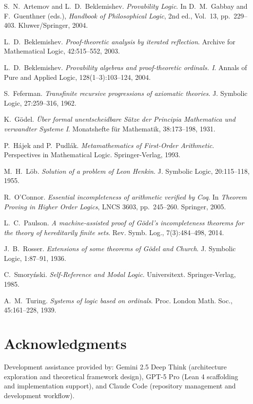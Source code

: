 \documentclass[11pt]{article}
\begin{document}
\begin{thebibliography}{10}

S.~N.~Artemov and L.~D.~Beklemishev.
\emph{Provability Logic}.
In D.~M.~Gabbay and F.~Guenthner (eds.), \emph{Handbook of Philosophical Logic}, 2nd ed., Vol.~13, pp.~229--403.
Kluwer/Springer, 2004.

L.~D.~Beklemishev.
\emph{Proof-theoretic analysis by iterated reflection}.
Archive for Mathematical Logic, 42:515--552, 2003.

L.~D.~Beklemishev.
\emph{Provability algebras and proof-theoretic ordinals. I}.
Annals of Pure and Applied Logic, 128(1--3):103--124, 2004.

S.~Feferman.
\emph{Transfinite recursive progressions of axiomatic theories}.
J. Symbolic Logic, 27:259--316, 1962.

K.~Gödel.
\emph{Über formal unentscheidbare Sätze der Principia Mathematica und verwandter Systeme I}.
Monatshefte für Mathematik, 38:173--198, 1931.

P.~Hájek and P.~Pudlák.
\emph{Metamathematics of First-Order Arithmetic}.
Perspectives in Mathematical Logic. Springer-Verlag, 1993.

M.~H.~Löb.
\emph{Solution of a problem of Leon Henkin}.
J. Symbolic Logic, 20:115--118, 1955.

R.~O'Connor.
\emph{Essential incompleteness of arithmetic verified by Coq}.
In \emph{Theorem Proving in Higher Order Logics}, LNCS 3603, pp.~245--260. Springer, 2005.

L.~C.~Paulson.
\emph{A machine-assisted proof of Gödel's incompleteness theorems for the theory of hereditarily finite sets}.
Rev. Symb. Log., 7(3):484--498, 2014.

J.~B.~Rosser.
\emph{Extensions of some theorems of Gödel and Church}.
J. Symbolic Logic, 1:87--91, 1936.

C.~Smoryński.
\emph{Self-Reference and Modal Logic}.
Universitext. Springer-Verlag, 1985.

A.~M.~Turing.
\emph{Systems of logic based on ordinals}.
Proc. London Math. Soc., 45:161--228, 1939.

\end{thebibliography}

\section*{Acknowledgments}
Development assistance provided by: Gemini 2.5 Deep Think (architecture exploration and theoretical framework design), GPT-5 Pro (Lean 4 scaffolding and implementation support), and Claude Code (repository management and development workflow).
\end{document}
